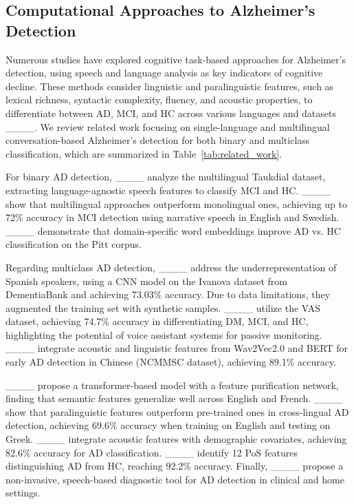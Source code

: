 \subsection{Computational Approaches to Alzheimer's Detection}

Numerous studies have explored cognitive task-based approaches for Alzheimer’s detection, using speech and language analysis as key indicators of cognitive decline. These methods consider linguistic and paralinguistic features, such as lexical richness, syntactic complexity, fluency, and acoustic properties, to differentiate between AD, MCI, and HC across various languages and datasets ____. We review related work focusing on single-language and multilingual conversation-based Alzheimer’s detection for both binary and multiclass classification, which are summarized in Table~\ref{tab:related_work}.


For binary AD detection, ____ analyze the multilingual Taukdial dataset, extracting language-agnostic speech features to classify MCI and HC. ____ show that multilingual approaches outperform monolingual ones, achieving up to 72\% accuracy in MCI detection using narrative speech in English and Swedish. ____ demonstrate that domain-specific word embeddings improve AD vs. HC classification on the Pitt corpus.

Regarding multiclass AD detection, ____ address the underrepresentation of Spanish speakers, using a CNN model on the Ivanova dataset from DementiaBank and achieving 73.03\% accuracy. Due to data limitations, they augmented the training set with synthetic samples. ____ utilize the VAS dataset, achieving 74.7\% accuracy in differentiating DM, MCI, and HC, highlighting the potential of voice assistant systems for passive monitoring. ____ integrate acoustic and linguistic features from Wav2Vec2.0 and BERT for early AD detection in Chinese (NCMMSC dataset), achieving 89.1\% accuracy.



____ propose a transformer-based model with a feature purification network, finding that semantic features generalize well across English and French. ____ show that paralinguistic features outperform pre-trained ones in cross-lingual AD detection, achieving 69.6\% accuracy when training on English and testing on Greek. ____ integrate acoustic features with demographic covariates, achieving 82.6\% accuracy for AD classification. ____ identify 12 PoS features distinguishing AD from HC, reaching 92.2\% accuracy. Finally, ____ propose a non-invasive, speech-based diagnostic tool for AD detection in clinical and home settings.